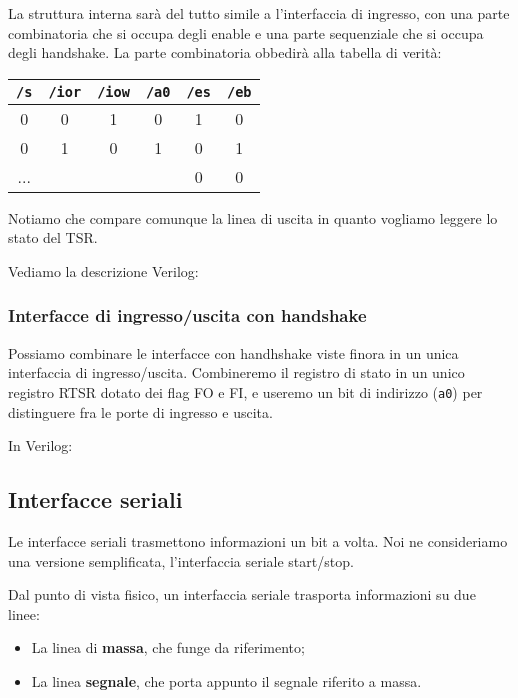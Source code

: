 \documentclass[a4paper,11pt]{article}
\begin{document}
La struttura interna sarà del tutto simile a l'interfaccia di ingresso, con una parte combinatoria che si occupa degli enable e una parte sequenziale che si occupa degli handshake.
La parte combinatoria obbedirà alla tabella di verità:
\begin{table}[h!]
	\center 
	\begin{tabular} { c  c  c  c | c  c }
		\lstinline|/s| & \lstinline|/ior| & \lstinline|/iow| & \lstinline|/a0| & \lstinline|/es| & \lstinline|/eb| \\ 
		\hline 
		0 & 0 & 1 & 0 & 1 & 0 \\ 
		0 & 1 & 0 & 1 & 0 & 1 \\ 
		... & & & & 0 & 0 
	\end{tabular}
\end{table}

Notiamo che compare comunque la linea di uscita in quanto vogliamo leggere lo stato del TSR.

Vediamo la descrizione Verilog:


\subsubsection{Interfacce di ingresso/uscita con handshake}
Possiamo combinare le interfacce con handhshake viste finora in un unica interfaccia di ingresso/uscita.
Combineremo il registro di stato in un unico registro RTSR dotato dei flag FO e FI, e useremo un bit di indirizzo (\lstinline|a0|) per distinguere fra le porte di ingresso e uscita. 

In Verilog: 


\subsection{Interfacce seriali}
Le interfacce seriali trasmettono informazioni un bit a volta.
Noi ne consideriamo una versione semplificata, l'interfaccia seriale start/stop.

Dal punto di vista fisico, un interfaccia seriale trasporta informazioni su due linee:
\begin{itemize}
	\item La linea di \textbf{massa}, che funge da riferimento;
	\item La linea \textbf{segnale}, che porta appunto il segnale riferito a massa.
\end{itemize}
\end{document}
